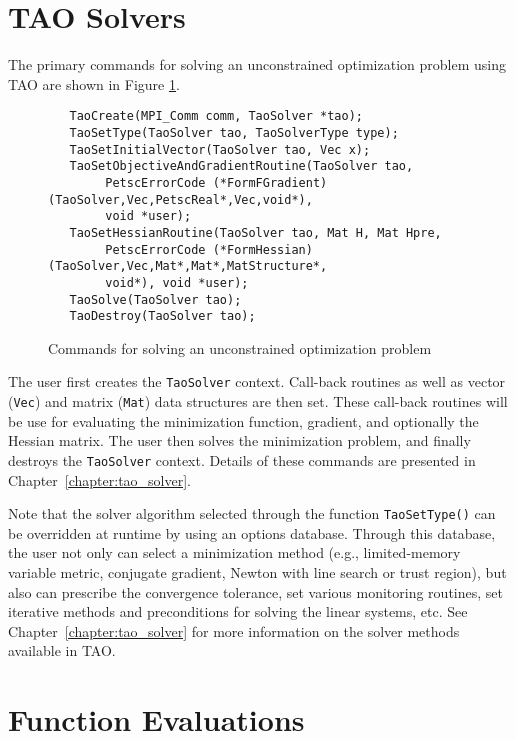 \section{TAO Solvers}

The primary commands for solving an unconstrained optimization problem
using TAO are shown in Figure \ref{fig:tao_commands}.
 
 
 

\begin{figure}[H]
\begin{verbatim}
   TaoCreate(MPI_Comm comm, TaoSolver *tao); 
   TaoSetType(TaoSolver tao, TaoSolverType type);
   TaoSetInitialVector(TaoSolver tao, Vec x);
   TaoSetObjectiveAndGradientRoutine(TaoSolver tao, 
        PetscErrorCode (*FormFGradient)(TaoSolver,Vec,PetscReal*,Vec,void*), 
        void *user);
   TaoSetHessianRoutine(TaoSolver tao, Mat H, Mat Hpre,
        PetscErrorCode (*FormHessian)(TaoSolver,Vec,Mat*,Mat*,MatStructure*,
        void*), void *user);
   TaoSolve(TaoSolver tao);
   TaoDestroy(TaoSolver tao);
\end{verbatim}
\caption{Commands for solving an unconstrained optimization problem
\label{fig:tao_commands}}
\end{figure}

\noindent
The user first creates the \texttt{TaoSolver} context. 
Call-back routines as well as vector (\texttt{Vec}) and matrix (\texttt{Mat}) 
data structures are then set.  These call-back routines will be use for 
evaluating the minimization function, gradient, and optionally the Hessian 
matrix.  The user then solves the minimization problem, and finally destroys
the \texttt{TaoSolver} context.  Details of these commands are presented in
Chapter~\ref{chapter:tao_solver}.

Note that the solver algorithm selected through the function 
\texttt{TaoSetType()} can be overridden
at runtime by using an options database.  Through this
database, the user not only can select a minimization method (e.g.,
limited-memory variable metric, conjugate gradient, Newton with line
search or trust region), but also can prescribe the convergence
tolerance, set various monitoring routines, set iterative methods
and preconditions for solving the linear systems, etc.  See 
Chapter~\ref{chapter:tao_solver} for more information on the 
solver methods available in TAO.

\section{Function Evaluations}

